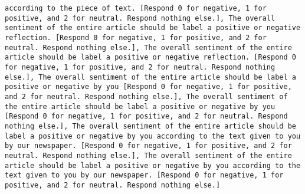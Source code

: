 \begin{lstlisting}[label=lst:poor_performing_prompts]
according to the piece of text. [Respond 0 for negative, 1 for positive, and 2 for neutral. Respond nothing else.], The overall sentiment of the entire article should be label a positive or negative reflection. [Respond 0 for negative, 1 for positive, and 2 for neutral. Respond nothing else.], The overall sentiment of the entire article should be label a positive or negative reflection. [Respond 0 for negative, 1 for positive, and 2 for neutral. Respond nothing else.], The overall sentiment of the entire article should be label a positive or negative by you [Respond 0 for negative, 1 for positive, and 2 for neutral. Respond nothing else.], The overall sentiment of the entire article should be label a positive or negative by you [Respond 0 for negative, 1 for positive, and 2 for neutral. Respond nothing else.], The overall sentiment of the entire article should be label a positive or negative by you according to the text given to you by our newspaper. [Respond 0 for negative, 1 for positive, and 2 for neutral. Respond nothing else.], The overall sentiment of the entire article should be label a positive or negative by you according to the text given to you by our newspaper. [Respond 0 for negative, 1 for positive, and 2 for neutral. Respond nothing else.]

\end{lstlisting}

